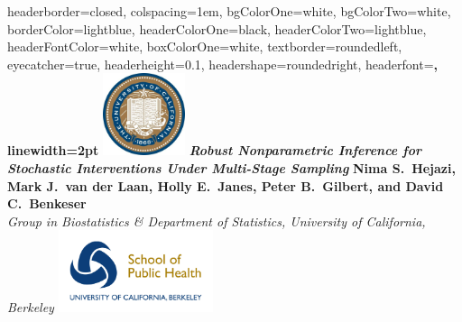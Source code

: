 \documentclass[landscape,a0paper,fontscale=0.285]{baposter} %
\begin{document}
\begin{poster} {
headerborder=closed, %
colspacing=1em, %
bgColorOne=white, %
bgColorTwo=white, %
borderColor=lightblue, %
headerColorOne=black, %
headerColorTwo=lightblue, %
headerFontColor=white, %
boxColorOne=white, %
textborder=roundedleft, %
eyecatcher=true, %
headerheight=0.1\textheight, %
headershape=roundedright, %
headerfont=\Large\bf\textsc, %
linewidth=2pt %
}
%
{\includegraphics[height=6.5em]{logo_cal.jpg}} %
{\bf\textit{\LARGE Robust Nonparametric Inference for Stochastic Interventions
    Under Multi-Stage Sampling}\vspace{0.01em}} %
{\textbf{Nima S.~Hejazi, Mark J.~van der Laan, Holly E.~Janes, Peter B.~Gilbert,
    and David C.~Benkeser} \\ \textit{Group in Biostatistics \& Department of
    Statistics, University of California, Berkeley}} %
{\includegraphics[height=6.5em]{logo_sph.jpg}} %


\end{poster}
\end{document}
